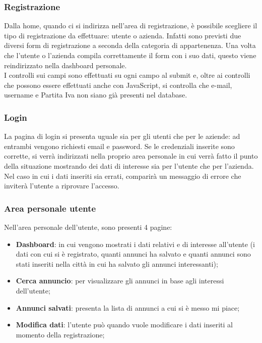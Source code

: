 		\subsubsection{Registrazione}
		Dalla home, quando ci si indirizza nell'area di registrazione, è possibile scegliere il tipo di registrazione da effettuare: utente o azienda. Infatti sono previsti due diversi form di registrazione a seconda della categoria di appartenenza. Una volta che l'utente o l'azienda compila correttamente il form con i suo dati, questo viene reindirizzato nella dashboard personale.\\
		I controlli sui campi sono effettuati su ogni campo al submit e, oltre ai controlli che possono essere effettuati anche con JavaScript, si controlla che e-mail, username e Partita Iva non siano già presenti nel database.
		\subsubsection{Login}
		La pagina di login si presenta uguale sia per gli utenti che per le aziende: ad entrambi vengono richiesti email e password. Se le credenziali inserite sono corrette, si verrà indirizzati nella proprio area personale in cui verrà fatto il punto della situazione mostrando dei dati di interesse sia per l'utente che per l'azienda. Nel caso in cui i dati inseriti sia errati, comparirà un messaggio di errore che inviterà l'utente a riprovare l'accesso.
		\subsubsection{Area personale utente}
		Nell'area personale dell'utente, sono presenti 4 pagine:
		\begin{itemize}
			\item \textbf{Dashboard}: in cui vengono mostrati i dati relativi e di interesse all'utente (i dati con cui si è registrato, quanti annunci ha salvato e quanti annunci sono stati inseriti nella città in cui ha salvato gli annunci interessanti);
			\item \textbf{Cerca annuncio}: per visualizzare gli annunci in base agli interessi dell'utente;
			\item \textbf{Annunci salvati}: presenta la lista di annunci a cui si è messo mi piace;
			\item \textbf{Modifica dati}: l'utente può quando vuole modificare i dati inseriti al momento della registrazione; 
		\end{itemize}

